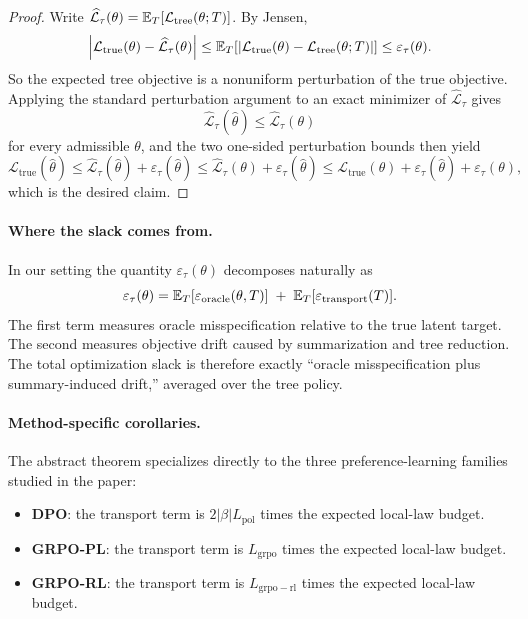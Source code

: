 \begin{proof}
Write
$\widehat{\mathcal{L}}_{\tau}(\theta)
= \mathbb{E}_{T}[\mathcal{L}_{\mathrm{tree}}(\theta;T)]$.
By Jensen,
\[
\left|
\mathcal{L}_{\mathrm{true}}(\theta) - \widehat{\mathcal{L}}_{\tau}(\theta)
\right|
\le
\mathbb{E}_T\!\left[
\left|
\mathcal{L}_{\mathrm{true}}(\theta)-\mathcal{L}_{\mathrm{tree}}(\theta;T)
\right|
\right]
\le \varepsilon_{\tau}(\theta).
\]
So the expected tree objective is a nonuniform perturbation of the true
objective. Applying the standard perturbation argument to an exact minimizer of
$\widehat{\mathcal{L}}_{\tau}$ gives
\[
\widehat{\mathcal{L}}_{\tau}(\widehat{\theta})
\le
\widehat{\mathcal{L}}_{\tau}(\theta)
\]
for every admissible $\theta$, and the two one-sided perturbation bounds then
yield
\[
\mathcal{L}_{\mathrm{true}}(\widehat{\theta})
\le
\widehat{\mathcal{L}}_{\tau}(\widehat{\theta})
  + \varepsilon_{\tau}(\widehat{\theta})
\le
\widehat{\mathcal{L}}_{\tau}(\theta)
  + \varepsilon_{\tau}(\widehat{\theta})
\le
\mathcal{L}_{\mathrm{true}}(\theta)
  + \varepsilon_{\tau}(\widehat{\theta})
  + \varepsilon_{\tau}(\theta),
\]
which is the desired claim.
\end{proof}

\paragraph{Where the slack comes from.}
In our setting the quantity $\varepsilon_{\tau}(\theta)$ decomposes naturally as
\[
\varepsilon_{\tau}(\theta)
=
\mathbb{E}_T[\varepsilon_{\mathrm{oracle}}(\theta,T)]
\;+\;
\mathbb{E}_T[\varepsilon_{\mathrm{transport}}(T)].
\]
The first term measures oracle misspecification relative to the true latent
target. The second measures objective drift caused by summarization and tree
reduction. The total optimization slack is therefore exactly
``oracle misspecification plus summary-induced drift,'' averaged over the tree
policy.

\paragraph{Method-specific corollaries.}
The abstract theorem specializes directly to the three preference-learning
families studied in the paper:
\begin{itemize}[nosep]
    \item \textbf{DPO}: the transport term is
    $2|\beta|L_{\mathrm{pol}}$ times the expected local-law budget.
    \item \textbf{GRPO-PL}: the transport term is
    $L_{\mathrm{grpo}}$ times the expected local-law budget.
    \item \textbf{GRPO-RL}: the transport term is
    $L_{\mathrm{grpo-rl}}$ times the expected local-law budget.
\end{itemize}

